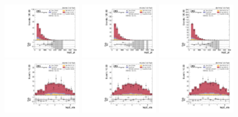 \begin{figure}[!ht]
  \centering
  \includegraphics[width=0.30\textwidth]{analysis_plots/2016_zv/cr_vjets_e/lep2_pt.pdf}
  \includegraphics[width=0.30\textwidth]{analysis_plots/2017_zv/cr_vjets_e/lep2_pt.pdf}
  \includegraphics[width=0.30\textwidth]{analysis_plots/2018_zv/cr_vjets_e/lep2_pt.pdf} \\
  \includegraphics[width=0.30\textwidth]{analysis_plots/2016_zv/cr_vjets_e/lep2_eta.pdf}
  \includegraphics[width=0.30\textwidth]{analysis_plots/2017_zv/cr_vjets_e/lep2_eta.pdf}
  \includegraphics[width=0.30\textwidth]{analysis_plots/2018_zv/cr_vjets_e/lep2_eta.pdf} \\

\end{figure}
